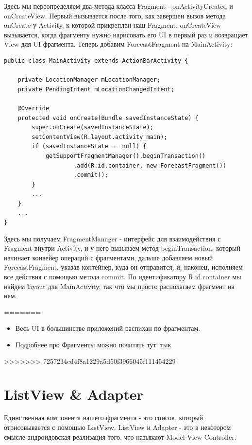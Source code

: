 \documentclass[12 pt]{article}
\begin{document}
Здесь мы переопределяем два метода класса Fragment - onActivityCreated и onCreateView. Первый вызывается после того, как завершен вызов метода onCreate у Activity, к которой прикреплен наш Fragment.\newline
onCreateView вызывается, когда фрагменту нужно нарисовать его UI в первый раз и возвращает View для UI фрагмента.\newline
Теперь добавим ForecastFragment на MainActivity:
	\begin{lstlisting}
public class MainActivity extends ActionBarActivity {

    private LocationManager mLocationManager;
    private PendingIntent mLocationChangedIntent;

    @Override
    protected void onCreate(Bundle savedInstanceState) {
        super.onCreate(savedInstanceState);
        setContentView(R.layout.activity_main);
        if (savedInstanceState == null) {
            getSupportFragmentManager().beginTransaction()
                    .add(R.id.container, new ForecastFragment())
                    .commit();
        }
        ...
    }
    ...
}
    \end{lstlisting}
Здесь мы получаем FragmentManager - интерфейс для взаимодействия с Fragment внутри Activity, и у него вызываем метод beginTransaction, который начинает конвейер операций с фрагментами, дальше добавляем новый ForecastFragment, указав контейнер, куда он отправится, и, наконец, исполняем все действия с помощью метода commit. По идентификатору R.id.container мы найдем layout для MainActivity, так что мы просто располагаем фрагмент на нем.

=======
    \begin{itemize}
	\item Весь UI в большинстве приложений распихан по фрагментам.
	\item Подробнее про Фрагменты можно почитать тут: \href{http://developer.alexanderklimov.ru/android/theory/fragments.php}{тык}
    \end{itemize}
>>>>>>> 7257234cd4f8a1229a5d50f3966045f111454229
\section{ListView \& Adapter}   
    Единственная компонента нашего фрагмента - это список, который отрисовывается с помощью ListView. \newline
    ListView и Adapter - это в некотором смысле андроидовская реализация того, что называют Model-View Controller.
    
\end{document}
